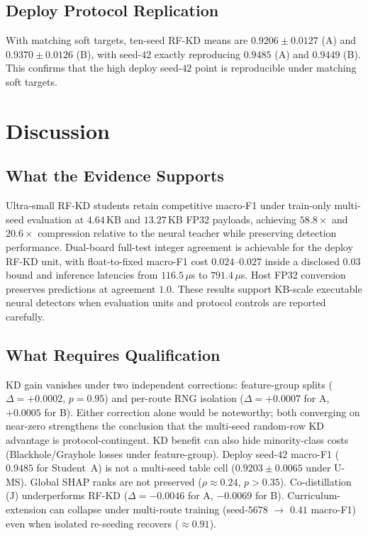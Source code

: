 \documentclass[journal]{IEEEtran}
\newcommand{\ums}{U-MS}
\begin{document}
\subsection{Deploy Protocol Replication}
\label{sec:results-deploy-style}
With matching soft targets, ten-seed RF-KD means are $0.9206 \pm 0.0127$ (A) and $0.9370 \pm 0.0126$ (B), with seed-$42$ exactly reproducing $0.9485$ (A) and $0.9449$ (B).
This confirms that the high deploy seed-$42$ point is reproducible under matching soft targets.

\section{Discussion}
\label{sec:discussion}

\subsection{What the Evidence Supports}
Ultra-small RF-KD students retain competitive macro-F1 under train-only multi-seed evaluation at $4.64$\,KB and $13.27$\,KB FP32 payloads, achieving $58.8\times$ and $20.6\times$ compression relative to the neural teacher while preserving detection performance.
Dual-board full-test integer agreement is achievable for the deploy RF-KD unit, with float-to-fixed macro-F1 cost $0.024$--$0.027$ inside a disclosed $0.03$ bound and inference latencies from $116.5$\,$\mu$s to $791.4$\,$\mu$s.
Host FP32 conversion preserves predictions at agreement $1.0$.
These results support KB-scale executable neural detectors when evaluation units and protocol controls are reported carefully.

\subsection{What Requires Qualification}
KD gain vanishes under two independent corrections: feature-group splits ($\Delta = +0.0002$, $p = 0.95$) and per-route RNG isolation ($\Delta = +0.0007$ for A, $+0.0005$ for B). Either correction alone would be noteworthy; both converging on near-zero strengthens the conclusion that the multi-seed random-row KD advantage is protocol-contingent. KD benefit can also hide minority-class costs (Blackhole/Grayhole losses under feature-group).
Deploy seed-$42$ macro-F1 ($0.9485$ for Student~A) is not a multi-seed table cell ($0.9203 \pm 0.0065$ under \ums{}).
Global SHAP ranks are not preserved ($\rho \approx 0.24$, $p > 0.35$).
Co-distillation (J) underperforms RF-KD ($\Delta = -0.0046$ for A, $-0.0069$ for B).
Curriculum-extension can collapse under multi-route training (seed-$5678$ $\rightarrow$ $0.41$ macro-F1) even when isolated re-seeding recovers ($\approx 0.91$).
\end{document}
